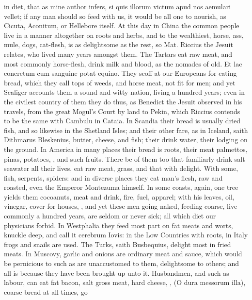 {{in diet, that as mine author infers, si quis illorum victum apud
nos aemulari vellet; if any man should so feed with us, it would be all
one to nourish, as Cicuta, Aconitum, or Hellebore itself. At this day
in China the common people live in a manner altogether on roots and
herbs, and to the wealthiest, horse, ass, mule, dogs, cat-flesh, is as
delightsome as the rest, so Mat. Riccius the Jesuit relates, who
lived many years amongst them. The Tartars eat raw meat, and most
commonly horse-flesh, drink milk and blood, as the nomades of
old. Et lac concretum cum sanguine potat equino. They scoff at our
Europeans for eating bread, which they call tops of weeds, and horse
meat, not fit for men; and yet Scaliger accounts them a sound and witty
nation, living a hundred years; even in the civilest country of them
they do thus, as Benedict the Jesuit observed in his travels, from the
great Mogul's Court by land to Pekin, which Riccius contends to be the
same with Cambulu in Cataia. In Scandia their bread is usually dried
fish, and so likewise in the Shetland Isles; and their other fare, as
in Iceland, saith Dithmarus Bleskenius, butter, cheese, and fish;
their drink water, their lodging on the ground. In America in many
places their bread is roots, their meat palmettos, pinas, potatoes,
\etc{}, and such fruits. There be of them too that familiarly drink
salt seawater all their lives, eat raw meat, grass, and
that with delight. With some, fish, serpents, spiders: and in diverse
places they eat man's flesh, raw and roasted, even the Emperor
Montezuma himself. In some coasts, again, one tree yields
them cocoanuts, meat and drink, fire, fuel, apparel; with his leaves,
oil, vinegar, cover for houses, \etc{}, and yet these men going naked,
feeding coarse, live commonly a hundred years, are seldom or never
sick; all which diet our physicians forbid. In Westphalia they feed
most part on fat meats and worts, knuckle deep, and call it
cerebrum Iovis: in the Low Countries with roots, in Italy frogs
and snails are used. The Turks, saith Busbequius, delight most in fried
meats. In Muscovy, garlic and onions are ordinary meat and sauce, which
would be pernicious to such as are unaccustomed to them, delightsome to
others; and all is because they have been brought up unto it.
Husbandmen, and such as labour, can eat fat bacon, salt gross meat,
hard cheese, \etc{}, (O dura messorum illa), coarse bread at all times, go
}}
